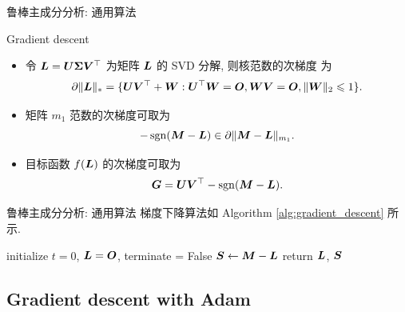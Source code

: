 \documentclass{beamer}
\begin{document}
\begin{frame}{鲁棒主成分分析: 通用算法}
  \begin{block}{Gradient descent}
    \begin{itemize}
      \item 令 $\bm{L}=\bm{U}\bm{\Sigma}\bm{V}^\top$ 为矩阵 $\bm{L}$ 的 SVD 分解, 则核范数的次梯度 \cite{watson1992characterization,diadochos2018derivative} 为
      \begin{equation}
        \partial\|\bm{L}\|_{*}=\{\bm{U}\bm{V}^\top+\bm{W}:\bm{U}^\top\bm{W}=\bm{O},\bm{W}\bm{V}=\bm{O},\|\bm{W}\|_2\leqslant1\}.
      \end{equation}
      \item 矩阵 $m_1$ 范数的次梯度可取为
      \begin{equation}
        -\operatorname{sgn}(\bm{M}-\bm{L})\in\partial\|\bm{M}-\bm{L}\|_{m_1}.
      \end{equation}
      \item 目标函数 $f(\bm{L})$ 的次梯度可取为
      \begin{equation}
        \label{eq:subgradient}
        \bm{G}=\bm{U}\bm{V}^\top-\operatorname{sgn}(\bm{M}-\bm{L}).
      \end{equation}
    \end{itemize}
  \end{block}
\end{frame}

\begin{frame}{鲁棒主成分分析: 通用算法}
  梯度下降算法如 Algorithm \ref{alg:gradient_descent} 所示.
  \begin{algorithm}[H]
    \small
    \label{alg:gradient_descent}
    \caption{Gradient descent for RPCA.}
    initialize $t=0$, $\bm{L}=\bm{O}$, terminate = False\;
    $\bm{S} \leftarrow \bm{M}-\bm{L}$\;
    return $\bm{L}$, $\bm{S}$\;
  \end{algorithm}
\end{frame}

\subsection{Gradient descent with Adam}
\end{document}
